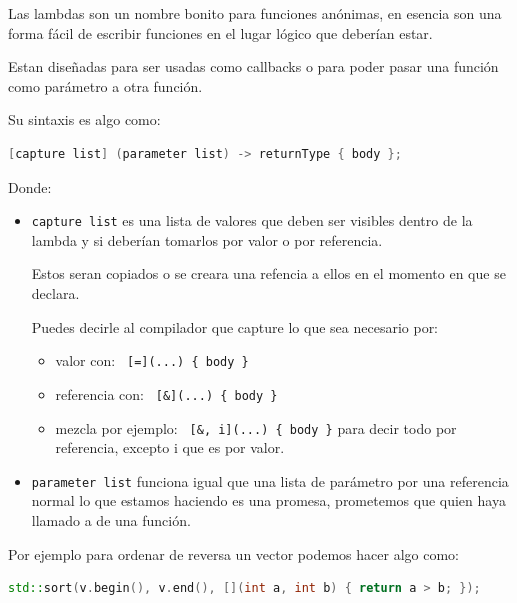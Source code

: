 \documentclass[12pt, fleqn]{report}                             %
\theoremstyle{break}                                            %
\newcommand{\textCode}[1]  { \texttt{#1} }                      %
\begin{document}
                Las lambdas son un nombre bonito para funciones anónimas, en esencia son una forma fácil
                de escribir funciones en el lugar lógico que deberían estar.

                Estan diseñadas para ser usadas como callbacks o para poder pasar una función como parámetro
                a otra función.

                Su sintaxis es algo como:
                \begin{lstlisting}[language=C++, gobble=20]
                    [capture list] (parameter list) -> returnType { body };
                \end{lstlisting} 

                Donde:
                \begin{itemize}
                    \item \textCode{capture list} es una lista de valores que deben ser visibles dentro
                        de la lambda y si deberían tomarlos por valor o por referencia.

                        Estos seran copiados o se creara una refencia a ellos en el momento en que se
                        declara.

                        Puedes decirle al compilador que capture lo que sea necesario por:
                        \begin{itemize}
                            \item valor con: \textCode{ [=](...) \{ body \}}
                            \item referencia con: \textCode{ [\&](...) \{ body \}}
                            \item mezcla  por ejemplo: \textCode{ [\&, i](...) \{ body \}} 
                            \; para decir todo por referencia, excepto i que es por valor. 
                        \end{itemize}

                        
                    \item \textCode{parameter list} funciona igual que una lista de parámetro por una referencia normal
                    lo que estamos haciendo es una promesa, prometemos que quien haya llamado a  
                        de una función.
                \end{itemize}

                Por ejemplo para ordenar de reversa un vector podemos hacer algo como:
                \begin{lstlisting}[language=C++, gobble=20]
                    std::sort(v.begin(), v.end(), [](int a, int b) { return a > b; });
                \end{lstlisting}
                
\end{document}
